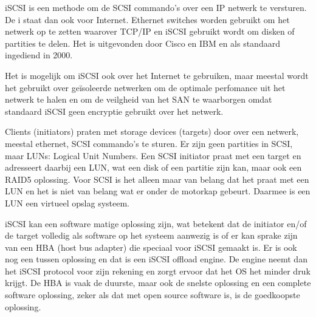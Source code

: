 iSCSI is een methode om de SCSI commando's over een IP netwerk te versturen. De i staat dan ook voor Internet. Ethernet switches worden gebruikt om het netwerk op te zetten waarover TCP/IP en iSCSI gebruikt wordt om disken of partities te delen. Het is uitgevonden door Cisco en IBM en als standaard ingediend in 2000.

Het is mogelijk om iSCSI ook over het Internet te gebruiken, maar meestal wordt het gebruikt over ge\"isoleerde netwerken om de optimale perfomance uit het netwerk te halen en om de veilgheid van het SAN te waarborgen omdat standaard iSCSI geen encryptie gebruikt over het netwerk.

Clients (initiators) praten met storage devices (targets) door over een netwerk, meestal ethernet, SCSI commando's te sturen. Er zijn geen partities in SCSI, maar LUNs: Logical Unit Numbers. Een SCSI initiator praat met een target en adresseert daarbij een LUN, wat een disk of een partitie zijn kan, maar ook een RAID5 oplossing. Voor SCSI is het alleen maar van belang dat het praat met een LUN en het is niet van belang wat er onder de motorkap gebeurt. Daarmee is een LUN een virtueel opslag systeem.

iSCSI kan een software matige oplossing zijn, wat betekent dat de initiator en/of de target volledig als software op het systeem aanwezig is of er kan sprake zijn van een HBA (host bus adapter) die speciaal voor iSCSI gemaakt is. Er is ook nog een tussen oplossing en dat is een iSCSI offload engine. De engine neemt dan het iSCSI protocol voor zijn rekening en zorgt ervoor dat het OS het minder druk krijgt. De HBA is vaak de duurste, maar ook de snelste oplossing en een complete software oplossing, zeker als dat met open source software is, is de goedkoopste oplossing.
